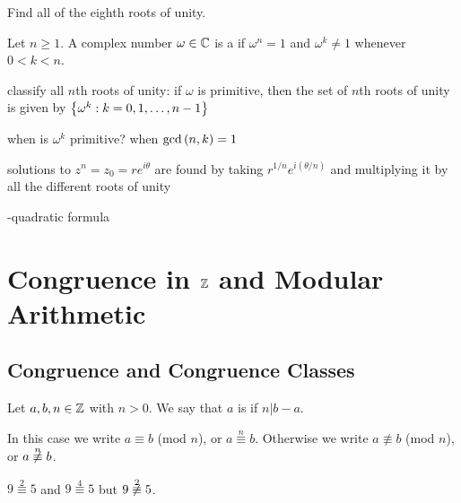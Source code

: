 \documentclass[11pt,fleqn,dvipsnames,usenames]{article}
\newcommand{\p}{\noindent}
\begin{document}
\example Find all of the eighth roots of unity.

\begin{definition} Let $n\geq 1$.  A complex number $\omega\in\mathbb{C}$ is a  if $\omega^{n} = 1$ and $\omega^{k}\neq 1$ whenever $0 < k < n$.
\end{definition}

\p classify all $n$th roots of unity: if $\omega$ is primitive, then the set of $n$th roots of unity is given by $\left\{\omega^{k}:k=0,1,\dots,n-1\right\}$

\p when is $\omega^{k}$ primitive? when $\text{gcd}\left(n,k\right) = 1$

\p solutions to $z^{n} = z_{0} = re^{i\theta}$ are found by taking $r^{1/n}e^{i(\theta/n)}$ and multiplying it by all the different roots of unity

\p -quadratic formula

\section{Congruence in $\mathbb{Z}$ and Modular Arithmetic}\label{congruencechapter}

\subsection{Congruence and Congruence Classes}

\begin{definition}\label{congruenceoperations}
Let $a,b,n\in\mathbb{Z}$ with $n > 0$.  We say that $a$ is  if $n|b-a$.
\end{definition}

\notation In this case we write $a\equiv b$ (mod $n$), or $a\overset{n}{\equiv}b$.  Otherwise we write $a\not\equiv b$ (mod $n$), or $a\not\overset{n}{\equiv}b$.

\example $9\overset{2}{\equiv}5$ and $9\overset{4}\equiv{5}$ but $9\not\overset{2}{\equiv}5$.
\end{document}
